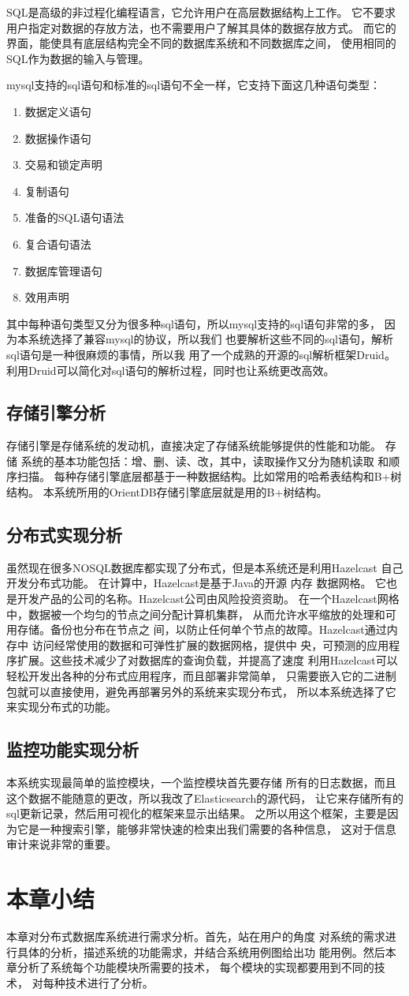 SQL是高级的非过程化编程语言，它允许用户在高层数据结构上工作。
它不要求用户指定对数据的存放方法，也不需要用户了解其具体的数据存放方式。
而它的界面，能使具有底层结构完全不同的数据库系统和不同数据库之间，
使用相同的SQL作为数据的输入与管理。

mysql支持的sql语句和标准的sql语句不全一样，它支持下面这几种语句类型：
\begin{enumerate}
	\item 数据定义语句     
\item 数据操作语句     
\item 交易和锁定声明     
\item 复制语句     
\item 准备的SQL语句语法     
\item 复合语句语法     
\item 数据库管理语句     
\item 效用声明  
\end{enumerate}   
其中每种语句类型又分为很多种sql语句，所以mysql支持的sql语句非常的多，
因为本系统选择了兼容mysql的协议，所以我们
也要解析这些不同的sql语句，解析sql语句是一种很麻烦的事情，所以我
用了一个成熟的开源的sql解析框架Druid。
利用Druid可以简化对sql语句的解析过程，同时也让系统更改高效。
\subsection{存储引擎分析}
存储引擎是存储系统的发动机，直接决定了存储系统能够提供的性能和功能。
存储
系统的基本功能包括：增、删、读、改，其中，读取操作又分为随机读取
和顺序扫描。
每种存储引擎底层都基于一种数据结构。比如常用的哈希表结构和B+树结构。
本系统所用的OrientDB存储引擎底层就是用的B+树结构。
\subsection{分布式实现分析}
虽然现在很多NOSQL数据库都实现了分布式，但是本系统还是利用Hazelcast
自己开发分布式功能。
在计算中，Hazelcast是基于Java的开源 内存 数据网格。
它也是开发产品的公司的名称。Hazelcast公司由风险投资资助。
在一个Hazelcast网格中，数据被一个均匀的节点之间分配计算机集群，
从而允许水平缩放的处理和可用存储。备份也分布在节点之
间，以防止任何单个节点的故障。Hazelcast通过内存中
访问经常使用的数据和可弹性扩展的数据网格，提供中
央，可预测的应用程序扩展。这些技术减少了对数据库的查询负载，并提高了速度
利用Hazelcast可以轻松开发出各种的分布式应用程序，而且部署非常简单，
只需要嵌入它的二进制包就可以直接使用，避免再部署另外的系统来实现分布式，
所以本系统选择了它来实现分布式的功能。
\subsection{监控功能实现分析}
本系统实现最简单的监控模块，一个监控模块首先要存储
所有的日志数据，而且这个数据不能随意的更改，所以我改了Elasticsearch的源代码，
让它来存储所有的sql更新记录，然后用可视化的框架来显示出结果。
之所以用这个框架，主要是因为它是一种搜索引擎，能够非常快速的检束出我们需要的各种信息，
这对于信息审计来说非常的重要。
\section{本章小结}
本章对分布式数据库系统进行需求分析。首先，站在用户的角度
对系统的需求进行具体的分析，描述系统的功能需求，并结合系统用例图给出功
能用例。然后本章分析了系统每个功能模块所需要的技术，
每个模块的实现都要用到不同的技术，
对每种技术进行了分析。
